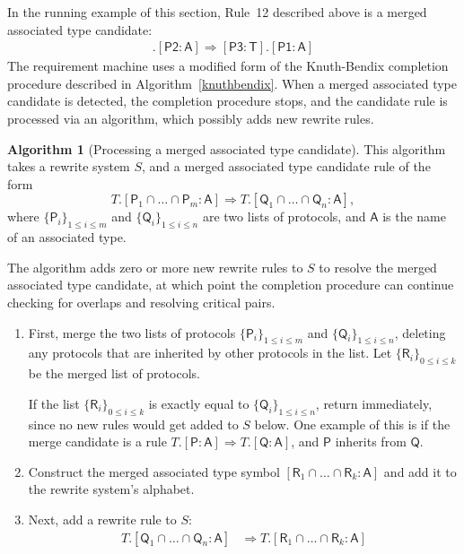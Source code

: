 \documentclass[headsepline,bibliography=totoc]{scrreport}
\newcommand{\namesym}[1]{\mathsf{#1}}
\newcommand{\proto}[1]{\bm{\mathsf{#1}}}
\newcommand{\assocsym}[2]{[\proto{#1}\colon\namesym{#2}]}
\theoremstyle{definition}
\theoremstyle{definition}
\theoremstyle{definition}
\newtheorem{algorithm}{Algorithm}[chapter]
\begin{document}
In the running example of this section, Rule~12 described above is a merged associated type candidate:
\begin{align}
\assocsym{P3}{T}.\assocsym{P2}{A}\Rightarrow\assocsym{P3}{T}.\assocsym{P1}{A}\tag{12}
\end{align}
The requirement machine uses a modified form of the Knuth-Bendix completion procedure described in Algorithm~\ref{knuthbendix}. When a merged associated type candidate is detected, the completion procedure stops, and the candidate rule is processed via an algorithm, which possibly adds new rewrite rules.

\begin{algorithm}[Processing a merged associated type candidate]
This algorithm takes a rewrite system $S$, and a merged associated type candidate rule of the form
\[T.[\proto{P}_1\cap\ldots\cap\proto{P}_m\colon\namesym{A}] \Rightarrow T.[\proto{Q}_1\cap\ldots\cap\proto{Q}_n\colon\namesym{A}],\]
where $\{\proto{P}_i\}_{1\leq i\leq m}$ and $\{\proto{Q}_i\}_{1\leq i\leq n}$ are two lists of protocols, and $\namesym{A}$ is the name of an associated type.

The algorithm adds zero or more new rewrite rules to $S$ to resolve the merged associated type candidate, at which point the completion procedure can continue checking for overlaps and resolving critical pairs.
\begin{enumerate}
\item First, merge the two lists of protocols $\{\proto{P}_i\}_{1\leq i\leq m}$ and $\{\proto{Q}_i\}_{1\leq i\leq n}$, deleting any protocols that are inherited by other protocols in the list. Let $\{\proto{R}_i\}_{0\leq i\leq k}$ be the merged list of protocols.

If the list $\{\proto{R}_i\}_{0\leq i\leq k}$ is exactly equal to $\{\proto{Q}_i\}_{1\leq i\leq n}$, return immediately, since no new rules would get added to $S$ below. One example of this is if the merge candidate is a rule $T.\assocsym{P}{A}\Rightarrow T.\assocsym{Q}{A}$, and $\proto{P}$ inherits from $\proto{Q}$.
\item Construct the merged associated type symbol $[\proto{R}_1\cap\ldots\cap\proto{R}_k\colon\namesym{A}]$ and add it to the rewrite system's alphabet.

\item Next, add a rewrite rule to $S$:
\begin{align*}
T.[\proto{Q}_1\cap\ldots\cap\proto{Q}_n\colon\namesym{A}] &\Rightarrow T.[\proto{R}_1\cap\ldots\cap\proto{R}_k\colon\namesym{A}]
\end{align*}


\end{enumerate}
\end{algorithm}
\end{document}
